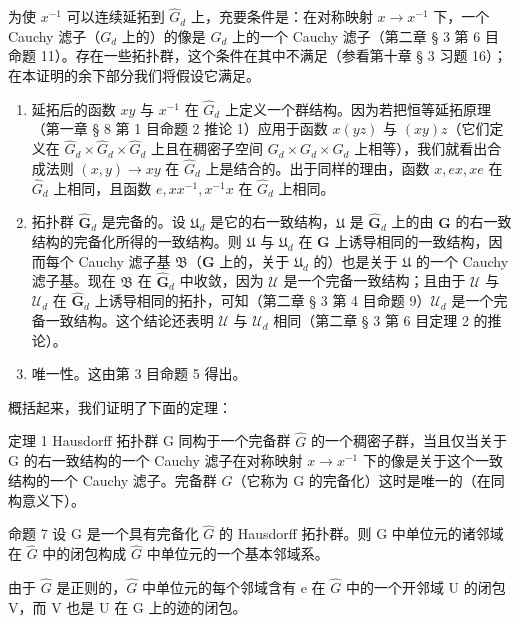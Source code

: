为使 \(x^{-1}\) 可以连续延拓到 \(\hat{G}_d\) 上，充要条件是：在对称映射 \(x \to x^{-1}\) 下，一个 Cauchy 滤子（\(G_d\) 上的）的像是 \(G_d\) 上的一个 Cauchy 滤子（第二章 § 3 第 6 目命题 11）。存在一些拓扑群，这个条件在其中不满足（参看第十章 § 3 习题 16）；在本证明的余下部分我们将假设它满足。

\begin{enumerate}
\def\labelenumi{\arabic{enumi})}
\setcounter{enumi}{1}
\item
  延拓后的函数 \(xy\) 与 \(x^{-1}\) 在 \(\hat{G}_d\) 上定义一个群结构。因为若把恒等延拓原理（第一章 § 8 第 1 目命题 2 推论 1）应用于函数 \(x(yz)\) 与 \((xy)z\)（它们定义在 \(\hat{G}_d \times \hat{G}_d \times \hat{G}_d\) 上且在稠密子空间 \(G_d \times G_d \times G_d\) 上相等），我们就看出合成法则 \((x, y) \to xy\) 在 \(\hat{G}_d\) 上是结合的。出于同样的理由，函数 \(x, ex, xe\) 在 \(\hat{G}_d\) 上相同，且函数 \(e, xx^{-1}, x^{-1}x\) 在 \(\hat{G}_d\) 上相同。
\item
  拓扑群 \(\hat{\mathbf{G}}_d\) 是完备的。设 \(\mathfrak{U}_d\) 是它的右一致结构，\(\mathfrak{U}\) 是 \(\hat{\mathbf{G}}_d\) 上的由 \(\mathbf{G}\) 的右一致结构的完备化所得的一致结构。则 \(\mathfrak{U}\) 与 \(\mathfrak{U}_d\) 在 \(\mathbf{G}\) 上诱导相同的一致结构，因而每个 Cauchy 滤子基 \(\mathfrak{B}\)（\(\mathbf{G}\) 上的，关于 \(\mathfrak{U}_d\) 的）也是关于 \(\mathfrak{U}\) 的一个 Cauchy 滤子基。现在 \(\mathfrak{B}\) 在 \(\hat{\mathbf{G}}_d\) 中收敛，因为 \(\mathcal{U}\) 是一个完备一致结构；且由于 \(\mathcal{U}\) 与 \(\mathcal{U}_d\) 在 \(\hat{\mathbf{G}}_d\) 上诱导相同的拓扑，可知（第二章 § 3 第 4 目命题 9）\(\mathcal{U}_d\) 是一个完备一致结构。这个结论还表明 \(\mathcal{U}\) 与 \(\mathcal{U}_d\) 相同（第二章 § 3 第 6 目定理 2 的推论）。
\item
  唯一性。这由第 3 目命题 5 得出。
\end{enumerate}

概括起来，我们证明了下面的定理：

定理 1 Hausdorff 拓扑群 G 同构于一个完备群 \(\hat{G}\) 的一个稠密子群，当且仅当关于 G 的右一致结构的一个 Cauchy 滤子在对称映射 \(x \to x^{-1}\) 下的像是关于这个一致结构的一个 Cauchy 滤子。完备群 \(\hat{G}\)（它称为 G 的完备化）这时是唯一的（在同构意义下）。

命题 7 设 G 是一个具有完备化 \(\hat{G}\) 的 Hausdorff 拓扑群。则 G 中单位元的诸邻域在 \(\hat{G}\) 中的闭包构成 \(\hat{G}\) 中单位元的一个基本邻域系。

由于 \(\hat{G}\) 是正则的，\(\hat{G}\) 中单位元的每个邻域含有 e 在 \(\hat{G}\) 中的一个开邻域 U 的闭包 V，而 V 也是 U 在 G 上的迹的闭包。


